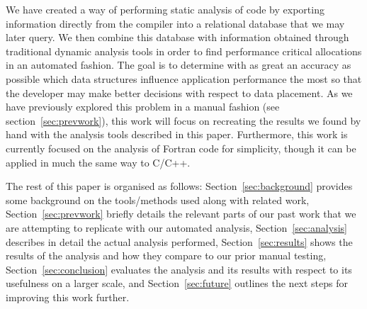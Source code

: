 We have created a way of performing static analysis of code by exporting information directly from the compiler into a relational database that we may later query.
We then combine this database with information obtained through traditional dynamic analysis tools in order to find performance critical allocations in an automated fashion.
The goal is to determine with as great an accuracy as possible which data structures influence application performance the most so that the developer may make better decisions with respect to data placement.
As we have previously explored this problem in a manual fashion (see section~\ref{sec:prevwork})\cite{Doudali:2017:CTE:3132402.3132418}, this work will focus on recreating the results we found by hand with the analysis tools described in this paper.
Furthermore, this work is currently focused on the analysis of Fortran code for simplicity, though it can be applied in much the same way to C/C++.

The rest of this paper is organised as follows: Section~\ref{sec:background} provides some background on the tools/methods used along with related work, Section~\ref{sec:prevwork} briefly details the relevant parts of our past work that we are attempting to replicate with our automated analysis, Section~\ref{sec:analysis} describes in detail the actual analysis performed, Section~\ref{sec:results} shows the results of the analysis and how they compare to our prior manual testing, Section~\ref{sec:conclusion} evaluates the analysis and its results with respect to its usefulness on a larger scale, and Section~\ref{sec:future} outlines the next steps for improving this work further.
